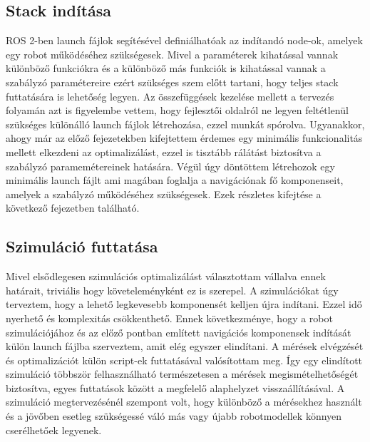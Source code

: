 \subsection{Stack indítása}
ROS 2-ben launch fájlok segítésével definiálhatóak az indítandó node-ok, amelyek egy robot működéséhez szükségesek. Mivel a paraméterek kihatással vannak különböző funkciókra és a különböző más funkciók is kihatással vannak a szabályzó paramétereire ezért szükséges szem előtt tartani, hogy teljes stack futtatására is lehetőség legyen. Az összefüggések kezelése mellett a tervezés folyamán azt is figyelembe vettem, hogy fejlesztői oldalról ne legyen feltétlenül szükséges különálló launch fájlok létrehozása, ezzel munkát spórolva. Ugyanakkor, ahogy már az előző fejezetekben kifejtettem érdemes egy minimális funkcionalitás mellett elkezdeni az optimalizálást, ezzel is tisztább rálátást biztosítva a szabályzó paramemétereinek hatására. Végül úgy döntöttem létrehozok egy minimális launch fájlt ami magában foglalja a navigációnak fő komponenseit, amelyek a szabályzó működéséhez szükségesek. Ezek részletes kifejtése a következő fejezetben található.

\subsection{Szimuláció futtatása}
Mivel elsődlegesen szimulációs optimalizálást választottam vállalva ennek határait, triviális hogy követeleményként ez is szerepel. A szimulációkat úgy terveztem, hogy a lehető legkevesebb komponensét kelljen újra indítani. Ezzel idő nyerhető és komplexitás csökkenthető. Ennek következménye, hogy a robot szimulációjához és az előző pontban említett navigációs komponensek indítását külön launch fájlba szerveztem, amit elég egyszer elindítani. A mérések elvégzését és optimalizációt külön script-ek futtatásával valósítottam meg. Így egy elindított szimuláció többször felhasználható természetesen a mérések megismételhetőségét biztosítva, egyes futtatások között a megfelelő alaphelyzet visszaállításával. A szimuláció megtervezésénél szempont volt, hogy különböző a mérésekhez használt és a jövőben esetleg szükségessé váló más vagy újabb robotmodellek könnyen cserélhetőek legyenek.

